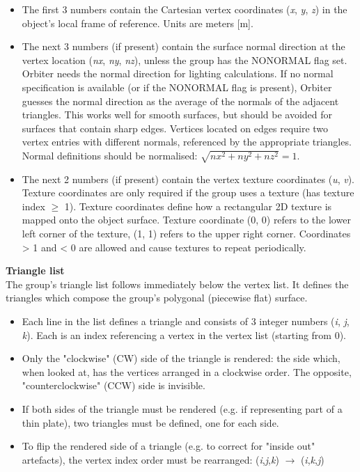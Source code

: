 \documentclass[Orbiter Developer Manual.tex]{subfiles}
\begin{document}
\begin{itemize}
\item The first 3 numbers contain the Cartesian vertex coordinates (\textit{x}, \textit{y}, \textit{z}) in the object's local frame of reference. Units are meters [m].
\item The next 3 numbers (if present) contain the surface normal direction at the vertex location (\textit{nx}, \textit{ny}, \textit{nz}), unless the group has the NONORMAL flag set. Orbiter needs the normal direction for lighting calculations. If no normal specification is available (or if the NONORMAL flag is present), Orbiter guesses the normal direction as the average of the normals of the adjacent triangles. This works well for smooth surfaces, but should be avoided for surfaces that contain sharp edges. Vertices located on edges require two vertex entries with different normals, referenced by the appropriate triangles. Normal definitions should be normalised: $\sqrt{nx^{2}+ny^{2}+nz^{2}} = 1$.
\item The next 2 numbers (if present) contain the vertex texture coordinates (\textit{u}, \textit{v}). Texture coordinates are only required if the group uses a texture (has texture index $\geq$ 1). Texture coordinates define how a rectangular 2D texture is mapped onto the object surface. Texture coordinate (0, 0) refers to the lower left corner of the texture, (1, 1) refers to the upper right corner. Coordinates > 1 and < 0 are allowed and cause textures to repeat periodically.
\end{itemize}


\noindent
\textbf{Triangle list}\\
The group's triangle list follows immediately below the vertex list. It defines the triangles which compose the group's polygonal (piecewise flat) surface.

\begin{itemize}
\item Each line in the list defines a triangle and consists of 3 integer numbers (\textit{i}, \textit{j}, \textit{k}). Each is an index referencing a vertex in the vertex list (starting from 0).
\item Only the "clockwise" (CW) side of the triangle is rendered: the side which, when looked at, has the vertices arranged in a clockwise order. The opposite, "counterclockwise" (CCW) side is invisible.
\item If both sides of the triangle must be rendered (e.g. if representing part of a thin plate), two triangles must be defined, one for each side.
\item To flip the rendered side of a triangle (e.g. to correct for "inside out" artefacts), the vertex index order must be rearranged: (\textit{i},\textit{j},\textit{k}) $\rightarrow$ (\textit{i},\textit{k},\textit{j})
\end{itemize}
\end{document}
